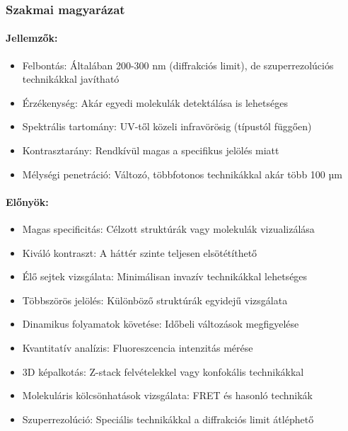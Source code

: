 \documentclass[a4paper,12pt]{article}
\begin{document}
\subsubsection{Szakmai magyarázat}

\paragraph{Jellemzők:} \begin{itemize} \item Felbontás: Általában 200-300 nm (diffrakciós limit), de szuperrezolúciós technikákkal javítható \item Érzékenység: Akár egyedi molekulák detektálása is lehetséges \item Spektrális tartomány: UV-től közeli infravörösig (típustól függően) \item Kontrasztarány: Rendkívül magas a specifikus jelölés miatt \item Mélységi penetráció: Változó, többfotonos technikákkal akár több 100 µm \end{itemize}

\paragraph{Előnyök:} \begin{itemize} \item Magas specificitás: Célzott struktúrák vagy molekulák vizualizálása \item Kiváló kontraszt: A háttér szinte teljesen elsötétíthető \item Élő sejtek vizsgálata: Minimálisan invazív technikákkal lehetséges \item Többszörös jelölés: Különböző struktúrák egyidejű vizsgálata \item Dinamikus folyamatok követése: Időbeli változások megfigyelése \item Kvantitatív analízis: Fluoreszcencia intenzitás mérése \item 3D képalkotás: Z-stack felvételekkel vagy konfokális technikákkal \item Molekuláris kölcsönhatások vizsgálata: FRET és hasonló technikák \item Szuperrezolúció: Speciális technikákkal a diffrakciós limit átléphető \end{itemize}
\end{document}
